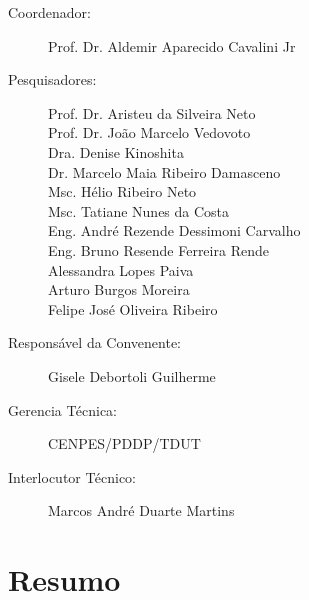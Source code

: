 \documentclass[12pt,fleqn,a4paper]{report}
\begin{document}
		\begin{normalsize}
			\begin{description}
				\vspace{20pt}
				\item[Coordenador:] Prof. Dr. Aldemir Aparecido Cavalini Jr \\
		
				\item[Pesquisadores:] Prof. Dr. Aristeu da Silveira Neto \\
				\hspace*{1.95cm} Prof. Dr. João Marcelo Vedovoto \\
				\hspace*{1.95cm} Dra. Denise Kinoshita \\
				\hspace*{1.95cm} Dr. Marcelo Maia Ribeiro Damasceno \\
				\hspace*{1.95cm} Msc. Hélio Ribeiro Neto \\
				\hspace*{1.95cm} Msc. Tatiane Nunes da Costa \\
				\hspace*{1.95cm} Eng. André Rezende Dessimoni Carvalho \\
				\hspace*{1.95cm} Eng. Bruno Resende Ferreira Rende\\
				\hspace*{1.95cm} Alessandra Lopes Paiva\\
				\hspace*{1.95cm} Arturo Burgos Moreira\\
				\hspace*{1.95cm} Felipe José Oliveira Ribeiro\\
		
				\item[Responsável da Convenente:] Gisele Debortoli Guilherme
				 
				\item[Gerencia Técnica:] CENPES/PDDP/TDUT
				\item[Interlocutor Técnico:] Marcos André Duarte Martins
			\end{description}
		\end{normalsize}

		\newpage
	\section*{Resumo}
	
\end{document}
